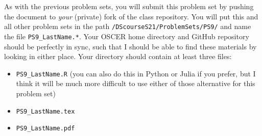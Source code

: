 \documentclass[12pt,english]{exam}
\begin{document}
As with the previous problem sets, you will submit this problem set by pushing the document to \emph{your} (private) fork of the class repository. You will put this and all other problem sets in the path \texttt{/DScourseS21/ProblemSets/PS9/} and name the file \texttt{PS9\_LastName.*}. Your OSCER home directory and GitHub repository should be perfectly in sync, such that I should be able to find these materials by looking in either place. Your directory should contain at least three files:
\begin{itemize}
    \item \texttt{PS9\_LastName.R} (you can also do this in Python or Julia if you prefer, but I think it will be much more difficult to use either of those alternative for this problem set)
    \item \texttt{PS9\_LastName.tex}
    \item \texttt{PS9\_LastName.pdf}
\end{itemize}
\end{document}
